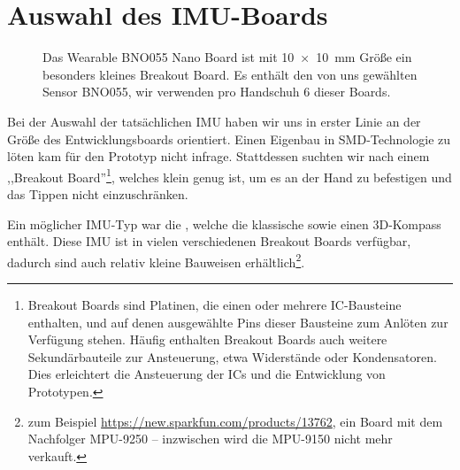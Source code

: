 \section{Auswahl des IMU-Boards}

\begin{figure}
    \centering
    \caption[Wearable BNO055 Nano Board]{Das Wearable BNO055 Nano Board ist mit \SI{10 x 10}{\milli\meter}
    Größe ein besonders kleines Breakout Board. Es enthält den von uns
    gewählten Sensor BNO055, wir verwenden pro Handschuh 6 dieser Boards.}
\end{figure}

Bei der Auswahl der tatsächlichen IMU haben wir uns in erster Linie an der
Größe des Entwicklungsboards orientiert. Einen Eigenbau in SMD-Technologie zu
löten kam für den Prototyp nicht infrage. Stattdessen suchten wir nach einem
,,Breakout Board''\footnote{Breakout Boards sind Platinen, die einen oder
mehrere IC-Bausteine enthalten, und auf denen ausgewählte Pins dieser Bausteine
zum Anlöten zur Verfügung stehen. Häufig enthalten Breakout Boards auch weitere
Sekundärbauteile zur Ansteuerung, etwa Widerstände oder Kondensatoren. Dies
erleichtert die Ansteuerung der ICs und die Entwicklung von Prototypen.},
welches klein genug ist, um es an der Hand zu befestigen und das Tippen nicht
einzuschränken.

Ein möglicher IMU-Typ war die , welche die
klassische  sowie einen  3D-Kompass
enthält. Diese IMU ist in vielen verschiedenen Breakout Boards verfügbar,
dadurch sind auch relativ kleine Bauweisen erhältlich\footnote{zum Beispiel
\url{https://new.sparkfun.com/products/13762}, ein Board mit dem Nachfolger
MPU-9250 -- inzwischen wird die MPU-9150 nicht mehr verkauft.}.

